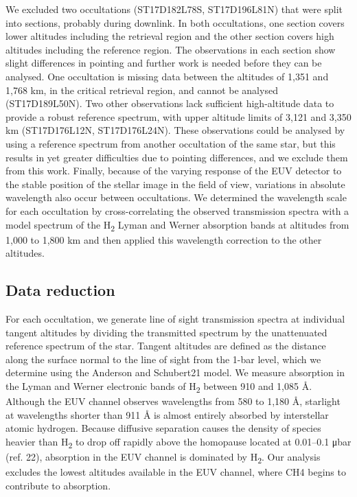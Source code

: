 We excluded two occultations (ST17D182L78S, ST17D196L81N) that were split into sections, probably during downlink. In both occultations, one section covers lower altitudes including the retrieval region and the other section covers high altitudes including the reference region. The observations in each section show slight differences in pointing and further work is needed before they can be analysed. One occultation is missing data between the altitudes of 1,351 and 1,768 km, in the critical retrieval region, and cannot be analysed (ST17D189L50N). Two other observations lack sufficient high-altitude data to provide a robust reference spectrum, with upper altitude limits of 3,121 and 3,350 km (ST17D176L12N, ST17D176L24N). These observations could be analysed by using a reference spectrum from another occultation of the same star, but this results in yet greater difficulties due to pointing differences, and we exclude them from this work. Finally, because of the varying response of the EUV detector to the stable position of the stellar image in the field of view, variations in absolute wavelength also occur between occultations. We determined the wavelength scale for each occultation by cross-correlating the observed transmission spectra with a model spectrum of the H\textsubscript{2} Lyman and Werner absorption bands at altitudes from 1,000 to 1,800 km and then applied this wavelength correction to the other altitudes.

\subsection{Data reduction}
For each occultation, we generate line of sight transmission spectra at individual tangent altitudes by dividing the transmitted spectrum by the unattenuated reference spectrum of the star. Tangent altitudes are defined as the distance along the surface normal to the line of sight from the 1-bar level, which we determine using the Anderson and Schubert21 model. We measure absorption in the Lyman and Werner electronic bands of H\textsubscript{2} between 910 and 1,085 Å. Although the EUV channel observes wavelengths from 580 to 1,180 Å, starlight at wavelengths shorter than 911 Å is almost entirely absorbed by interstellar atomic hydrogen. Because diffusive separation causes the density of species heavier than H\textsubscript{2} to drop off rapidly above the homopause located at 0.01–0.1 μbar (ref. 22), absorption in the EUV channel is dominated by H\textsubscript{2}. Our analysis excludes the lowest altitudes available in the EUV channel, where CH4 begins to contribute to absorption.

